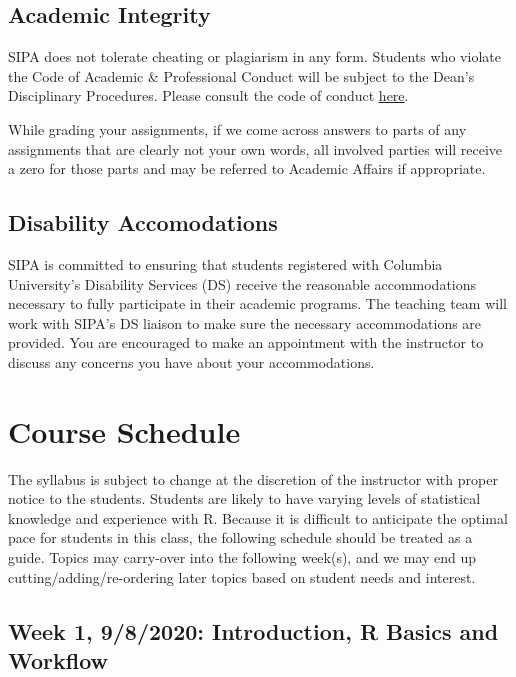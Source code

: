 \documentclass[11pt,]{article}
\begin{document}
\hypertarget{academic-integrity}{%
\subsection{Academic Integrity}\label{academic-integrity}}

SIPA does not tolerate cheating or plagiarism in any form. Students who
violate the Code of Academic \& Professional Conduct will be subject to
the Dean's Disciplinary Procedures. Please consult the code of conduct
\href{http://bulletin.columbia.edu/sipa/academic-policies/discipline-procedures/index.html}{here}.

While grading your assignments, if we come across answers to parts of
any assignments that are clearly not your own words, all involved
parties will receive a zero for those parts and may be referred to
Academic Affairs if appropriate.

\hypertarget{disability-accomodations}{%
\subsection{Disability Accomodations}\label{disability-accomodations}}

SIPA is committed to ensuring that students registered with Columbia
University's Disability Services (DS) receive the reasonable
accommodations necessary to fully participate in their academic
programs. The teaching team will work with SIPA's DS liaison to make
sure the necessary accommodations are provided. You are encouraged to
make an appointment with the instructor to discuss any concerns you have
about your accommodations.

\hypertarget{course-schedule}{%
\section{Course Schedule}\label{course-schedule}}

The syllabus is subject to change at the discretion of the instructor
with proper notice to the students. Students are likely to have varying
levels of statistical knowledge and experience with R. Because it is
difficult to anticipate the optimal pace for students in this class, the
following schedule should be treated as a guide. Topics may carry-over
into the following week(s), and we may end up cutting/adding/re-ordering
later topics based on student needs and interest.

\hypertarget{week-1-982020-introduction-r-basics-and-workflow}{%
\subsection{Week 1, 9/8/2020: Introduction, R Basics and
Workflow}\label{week-1-982020-introduction-r-basics-and-workflow}}
\end{document}
